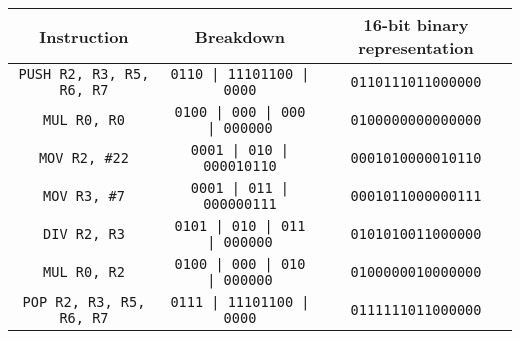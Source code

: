 \begin{tabular}{ccc}
    \toprule
    \textbf{Instruction}
     &
    \textbf{Breakdown}
     &
    \textbf{16-bit binary representation}
    \\
    \midrule
    \texttt{PUSH R2, R3, R5, R6, R7}
     &
    \texttt{0110 | 11101100 | 0000}
     &
    \texttt{0110111011000000}
    \\
    \midrule
    \texttt{MUL R0, R0}
     &
    \texttt{0100 | 000 | 000 | 000000}
     &
    \texttt{0100000000000000}
    \\
    \midrule
    \texttt{MOV R2, \#22}
     &
    \texttt{0001 | 010 | 000010110}
     &
    \texttt{0001010000010110}
    \\
    \midrule
    \texttt{MOV R3, \#7}
     &
    \texttt{0001 | 011 | 000000111}
     &
    \texttt{0001011000000111}
    \\
    \midrule
    \texttt{DIV R2, R3}
     &
    \texttt{0101 | 010 | 011 | 000000}
     &
    \texttt{0101010011000000}
    \\
    \midrule
    \texttt{MUL R0, R2}
     &
    \texttt{0100 | 000 | 010 | 000000}
     &
    \texttt{0100000010000000}
    \\
    \midrule
    \texttt{POP R2, R3, R5, R6, R7}
     &
    \texttt{0111 | 11101100 | 0000}
     &
    \texttt{0111111011000000}
    \\
    \bottomrule
\end{tabular}
